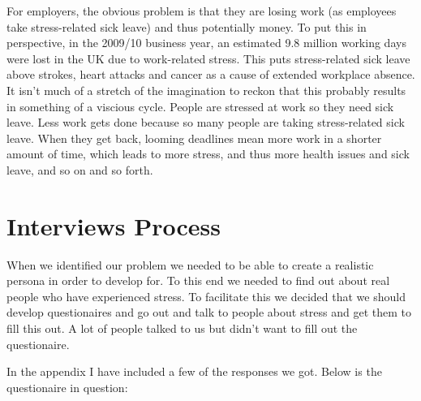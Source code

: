 \documentclass{scrartcl}
\begin{document}
For employers, the obvious problem is that they are losing work (as employees take stress-related sick leave) and thus
potentially money. To put this in perspective, in the 2009/10 business year, an estimated 9.8 million working days
were lost in the UK due to work-related stress. This puts stress-related sick leave above strokes, heart attacks and
cancer as a cause of extended workplace absence. It isn't much of a stretch of the imagination to reckon that this
probably results in something of a viscious cycle. People are stressed at work so they need sick leave. Less work gets
done because so many people are taking stress-related sick leave. When they get back, looming deadlines mean more work
in a shorter amount of time, which leads to more stress, and thus more health issues and sick leave, and so on and so forth.

\section{Interviews Process}
When we identified our problem we needed to be able to create a realistic persona
in order to develop for. To this end we needed to find out about real people
who have experienced stress. To facilitate this we decided that we should
develop questionaires and go out and talk to people about stress and get them to 
fill this out. A lot of people talked to us but didn't want to fill out the 
questionaire.

In the appendix I have included a few of the responses we got. Below is the 
questionaire in question:

\end{document}
